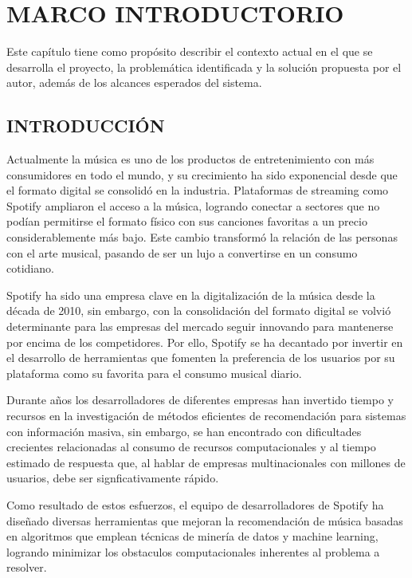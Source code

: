 \chapter{MARCO INTRODUCTORIO}

Este capítulo tiene como propósito describir el contexto actual en el que se desarrolla el proyecto, la problemática identificada y la solución propuesta por el autor, además de los alcances esperados del sistema.


\section{INTRODUCCIÓN}

\setlength{\parindent}{0pt}      
\setlength{\parskip}{1em}

Actualmente la música es uno de los productos de entretenimiento con más consumidores en todo el mundo, y su crecimiento ha sido exponencial desde que el formato digital se consolidó en la industria. Plataformas de streaming como Spotify ampliaron el acceso a la música, logrando conectar a sectores que no podían permitirse el formato físico con sus canciones favoritas a un precio considerablemente más bajo. Este cambio transformó la relación de las personas con el arte musical, pasando de ser un lujo a convertirse en un consumo cotidiano.



Spotify ha sido una empresa clave en la digitalización de la música desde la década de 2010, sin embargo, con la consolidación del formato digital se volvió determinante para las empresas del mercado seguir innovando para mantenerse por encima de los competidores.
Por ello, Spotify se ha decantado por invertir en el desarrollo de herramientas que fomenten la preferencia de los usuarios por su plataforma como su favorita para el consumo musical diario.


Durante años los desarrolladores de diferentes empresas han invertido tiempo y recursos en la investigación de métodos eficientes de recomendación para sistemas con información masiva, sin embargo, se han encontrado con dificultades crecientes relacionadas al consumo de recursos computacionales y al tiempo estimado de respuesta que, al hablar de empresas multinacionales con millones de usuarios, debe ser signficativamente rápido.


Como resultado de estos esfuerzos, el equipo de desarrolladores de Spotify ha diseñado diversas herramientas que mejoran la recomendación de música basadas en algoritmos que emplean técnicas de minería de datos y machine learning, logrando minimizar los obstaculos computacionales inherentes al problema a resolver.

